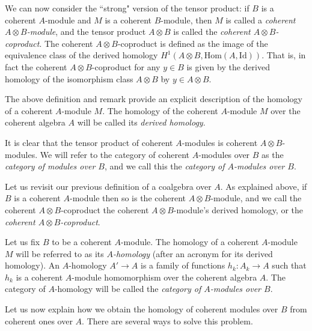 \documentclass[a4paper,reqno,oneside]{article}
\begin{document}
We can now consider the ``strong" version of the tensor product: if $B$ is a coherent $A$-module and $M$ is a coherent $B$-module, then $M$ is called a \textit{coherent $A \otimes B$-module}, and the tensor product $A \otimes B$ is called the \textit{coherent $A \otimes B$-coproduct}. The coherent $A \otimes B$-coproduct is defined as the image of the equivalence class of the derived homology $H^1(A \otimes B, \mathrm{Hom}(A,\mathrm{Id}))$. That is, in fact the coherent $A \otimes B$-coproduct for any $y \in B$ is given by the derived homology of the isomorphism class $A \otimes B$ by $y \in A \otimes B$.

The above definition and remark provide an explicit description of the homology of a coherent $A$-module $M$. The homology of the coherent $A$-module $M$ over the coherent algebra $A$ will be called its \textit{derived homology}.

It is clear that the tensor product of coherent $A$-modules is coherent $A \otimes B$-modules. We will refer to the category of coherent $A$-modules over $B$ as the \textit{category of modules over $B$}, and we call this the \textit{category of $A$-modules over $B$}. 

Let us revisit our previous definition of a coalgebra over $A$. As explained above, if $B$ is a coherent $A$-module then so is the coherent $A \otimes B$-module, and we call the coherent $A \otimes B$-coproduct the coherent $A \otimes B$-module's derived homology, or the \textit{coherent $A \otimes B$-coproduct}.

Let us fix $B$ to be a coherent $A$-module. The homology of a coherent $A$-module $M$ will be referred to as its \textit{$A$-homology} (after an acronym for its derived homology). An $A$-homology $A' \to A$ is a family of functions $h_k: A_k \to A$ such that $h_k$ is a coherent $A$-module homomorphism over the coherent algebra $A$. The category of $A$-homology will be called the \textit{category of $A$-modules over $B$}. 

Let us now explain how we obtain the homology of coherent modules over $B$ from coherent ones over $A$. There are several ways to solve this problem.
\end{document}
